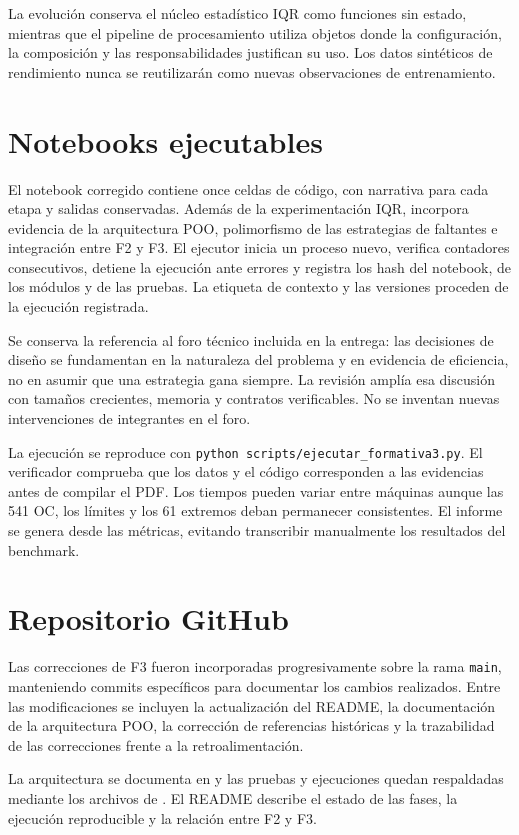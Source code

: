 \documentclass[11pt,letterpaper]{article}
\begin{document}
La evolución conserva el núcleo estadístico IQR como funciones sin estado, mientras que el
pipeline de procesamiento utiliza objetos donde la configuración, la composición y las
responsabilidades justifican su uso. Los datos sintéticos de rendimiento nunca se reutilizarán
como nuevas observaciones de entrenamiento.

\section{Notebooks ejecutables}
El notebook corregido contiene once celdas de código, con narrativa para cada etapa y salidas
conservadas. Además de la experimentación IQR, incorpora evidencia de la arquitectura POO,
polimorfismo de las estrategias de faltantes e integración entre F2 y F3. El ejecutor inicia un
proceso nuevo, verifica contadores consecutivos, detiene la ejecución ante errores y registra
los hash del notebook, de los módulos y de las pruebas. La etiqueta de contexto y las versiones
proceden de la ejecución registrada.

Se conserva la referencia al foro técnico incluida en la entrega: las decisiones de diseño se
fundamentan en la naturaleza del problema y en evidencia de eficiencia, no en asumir que una
estrategia gana siempre. La revisión amplía esa discusión con tamaños crecientes, memoria y
contratos verificables. No se inventan nuevas intervenciones de integrantes en el foro.

La ejecución se reproduce con \texttt{python scripts/ejecutar\_formativa3.py}. El verificador
comprueba que los datos y el código corresponden a las evidencias antes de compilar el PDF.
Los tiempos pueden variar entre máquinas aunque las 541 OC, los límites y los 61 extremos
deban permanecer consistentes. El informe se genera desde las métricas, evitando transcribir
manualmente los resultados del benchmark.

\section{Repositorio GitHub}
Las correcciones de F3 fueron incorporadas progresivamente sobre la rama \texttt{main},
manteniendo commits específicos para documentar los cambios realizados. Entre las modificaciones
se incluyen la actualización del README, la documentación de la arquitectura POO, la corrección
de referencias históricas y la trazabilidad de las correcciones frente a la retroalimentación.

La arquitectura se documenta en  y las pruebas y ejecuciones quedan
respaldadas mediante los archivos de . El README describe el estado de las
fases, la ejecución reproducible y la relación entre F2 y F3.
\end{document}
